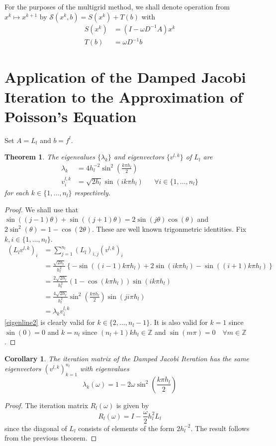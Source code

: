 \documentclass[a4paper,10pt,oneside]{book}
\theoremstyle{plain}%
\newtheorem{thm}{Theorem}[section]
\newtheorem*{cor}{Corollary}
\theoremstyle{definition}
\theoremstyle{remark}
\newcommand{\bbZ}{\mathbb{Z}}
\newcommand{\calS}{\mathcal{S}}
\newcommand{\hl}{h_l} %
\newcommand{\Omegal}{\Omega_l} %
\newcommand{\nl}{n_l} %
\newcommand{\fl}{f^l}
\newcommand{\Ll}{L_l}
\begin{document}
For the purposes of the multigrid method, we shall denote operation from
$x^k\mapsto x^{k+1}$ by $\calS(x^k, b)=S(x^k)+T(b)$ with
\begin{align}
 S(x^k) &= \left(I-\omega D^{-1}A\right)x^k\\
 T(b)   &= \omega D^{-1}b
\end{align}


\section{Application of the Damped Jacobi Iteration to the Approximation of
Poisson's Equation}
Set $A=\Ll$ and $b=\fl$.
\begin{thm}
 The eigenvalues $\{\lambda_k\}$ and eigenvectors $\{v^{l,k}\}$ of $\Ll$ are
 \begin{align}
  \lambda_k&=4\hl^{-2}\sin^2\left(\frac{k\pi\hl}{2}\right)\\
  v^{l,k}_i&=\sqrt{2\hl}\sin(ik\pi\hl)&&\forall i\in\{1,\dotsc,\nl\}
 \end{align}
 for each $k\in\{1,\dotsc,\nl\}$ respectively.
\end{thm}
\begin{proof}
 We shall use that
$\sin((j-1)\theta)+\sin((j+1)\theta)=2\sin(j\theta)\cos(\theta)$ and
$2\sin^2(\theta)=1-\cos(2\theta)$. These are well known trigonmetric identities.
Fix $k,i\in\{1,\dotsc,\nl\}$.
 \begin{align}
  (\Ll v^{l,k})_i&=\sum_{j=1}^{\nl}(\Ll)_{i,j}(v^{l,k})_i\\
    &=\frac{\sqrt{2h_l}}{h_l^2}\left\{-\sin((i-1)k\pi h_l)+2\sin(ik\pi
h_l)-\sin((i+1)k\pi h_l)\right\}\label{eigenline2}\\
    &=\frac{2\sqrt{2h_l}}{h_l^2}\left(1-\cos(k\pi h_l)\right)\sin(ik\pi h_l)\\
    &=\frac{4\sqrt{2h_l}}{h_l^2}\sin^2\left(\frac{k\pi h_l}{2}\right)\sin(j i\pi
h_l)\\
    &=\lambda_kv^{l,k}_i
 \end{align}
 \eqref{eigenline2} is clearly valid for $k\in\{2,\dotsc,n_l-1\}$. It is also
valid for $k=1$ since $\sin(0)=0$ and $k=\nl$ since $(\nl+1)k\hl\in\bbZ$ and
$\sin(m\pi)=0\quad\forall m\in\bbZ$.
\end{proof}

\begin{cor}
 The iteration matrix of the Damped Jacobi Iteration has the same eigenvectors
$(v^{l,k})_{k=1}^{\nl}$ with eigenvalues
 \begin{equation}
  \lambda_k(\omega)=1-2\omega\sin^2\left(\frac{k\pi h_l}{2}\right)
 \end{equation}

\end{cor}
\begin{proof}
 The iteration matrix $R_l(\omega)$ is given by
 \begin{equation}
  R_l(\omega)=I-\frac{\omega}{2} h_l^2L_l
 \end{equation}
 since the diagonal of $\Ll$ consists of elements of the form
$2\hl^{-2}$. The result follows from the previous theorem.
\end{proof}
\end{document}

